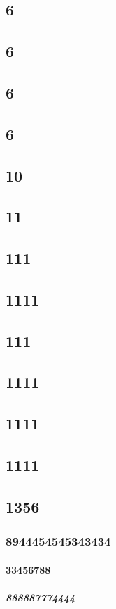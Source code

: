 \documentclass[11pt,a4paper]{article}
\begin{document}
\subsection{6}

\subsection{6}

\subsection{6}

\subsection{6}

\subsection{10}

\subsection{11}

\subsection{111}

\subsection{1111}

\subsection{111}

\subsection{1111}

\subsection{1111}

\subsection{1111}

\subsection{1356}

\subsubsection{8944454545343434}

\paragraph{33456788}

\subparagraph{888887774444}
\end{document}

